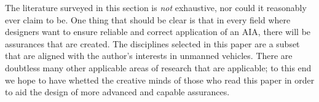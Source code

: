     The literature surveyed in this section is \emph{not} exhaustive, nor could it reasonably ever claim to be. One thing that should be clear is that in every field where designers want to ensure reliable and correct application of an AIA, there will be assurances that are created. The disciplines selected in this paper are a subset that are aligned with the author's interests in unmanned vehicles. There are doubtless many other applicable areas of research that are applicable; to this end we hope to have whetted the creative minds of those who read this paper in order to aid the design of more advanced and capable assurances.
